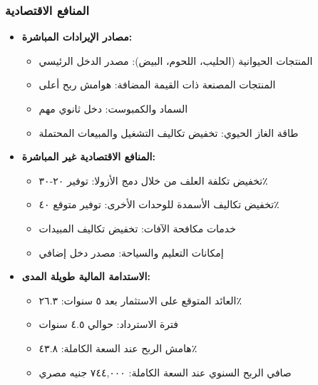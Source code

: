 \subsubsection{المنافع الاقتصادية}
\begin{itemize}
    \item \textbf{مصادر الإيرادات المباشرة:}
    \begin{itemize}
        \item المنتجات الحيوانية (الحليب، اللحوم، البيض): مصدر الدخل الرئيسي
        \item المنتجات المصنعة ذات القيمة المضافة: هوامش ربح أعلى
        \item السماد والكمبوست: دخل ثانوي مهم
        \item طاقة الغاز الحيوي: تخفيض تكاليف التشغيل والمبيعات المحتملة
    \end{itemize}
    
    \item \textbf{المنافع الاقتصادية غير المباشرة:}
    \begin{itemize}
        \item تخفيض تكلفة العلف من خلال دمج الأزولا: توفير ٢٠-٣٠٪
        \item تخفيض تكاليف الأسمدة للوحدات الأخرى: توفير متوقع ٤٠٪
        \item خدمات مكافحة الآفات: تخفيض تكاليف المبيدات
        \item إمكانات التعليم والسياحة: مصدر دخل إضافي
    \end{itemize}
    
    \item \textbf{الاستدامة المالية طويلة المدى:}
    \begin{itemize}
        \item العائد المتوقع على الاستثمار بعد ٥ سنوات: ٢٦.٣٪
        \item فترة الاسترداد: حوالي ٤.٥ سنوات
        \item هامش الربح عند السعة الكاملة: ٤٣.٨٪
        \item صافي الربح السنوي عند السعة الكاملة: ٧٤٤,٠٠٠ جنيه مصري
    \end{itemize}
\end{itemize}

